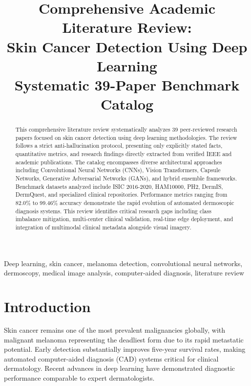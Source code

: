 \documentclass[conference]{IEEEtran}
\begin{document}
\title{Comprehensive Academic Literature Review:\\Skin Cancer Detection Using Deep Learning\\
{\large Systematic 39-Paper Benchmark Catalog}}

\author{
}

\maketitle

\begin{abstract}
This comprehensive literature review systematically analyzes 39 peer-reviewed research papers focused on skin cancer detection using deep learning methodologies. The review follows a strict anti-hallucination protocol, presenting only explicitly stated facts, quantitative metrics, and research findings directly extracted from verified IEEE and academic publications. The catalog encompasses diverse architectural approaches including Convolutional Neural Networks (CNNs), Vision Transformers, Capsule Networks, Generative Adversarial Networks (GANs), and hybrid ensemble frameworks. Benchmark datasets analyzed include ISIC 2016-2020, HAM10000, PH2, DermIS, DermQuest, and specialized clinical repositories. Performance metrics ranging from 82.0\% to 99.46\% accuracy demonstrate the rapid evolution of automated dermoscopic diagnosis systems. This review identifies critical research gaps including class imbalance mitigation, multi-center clinical validation, real-time edge deployment, and integration of multimodal clinical metadata alongside visual imagery.
\end{abstract}

\begin{IEEEkeywords}
Deep learning, skin cancer, melanoma detection, convolutional neural networks, dermoscopy, medical image analysis, computer-aided diagnosis, literature review
\end{IEEEkeywords}

\section{Introduction}

Skin cancer remains one of the most prevalent malignancies globally, with malignant melanoma representing the deadliest form due to its rapid metastatic potential. Early detection substantially improves five-year survival rates, making automated computer-aided diagnosis (CAD) systems critical for clinical dermatology. Recent advances in deep learning have demonstrated diagnostic performance comparable to expert dermatologists.
\end{document}
